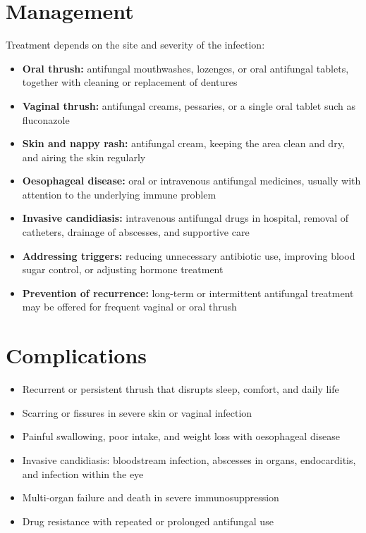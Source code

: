 \section*{Management}
Treatment depends on the site and severity of the infection:
\begin{itemize}
    \item \textbf{Oral thrush:} antifungal mouthwashes, lozenges, or oral antifungal tablets, together with cleaning or replacement of dentures
    \item \textbf{Vaginal thrush:} antifungal creams, pessaries, or a single oral tablet such as fluconazole
    \item \textbf{Skin and nappy rash:} antifungal cream, keeping the area clean and dry, and airing the skin regularly
    \item \textbf{Oesophageal disease:} oral or intravenous antifungal medicines, usually with attention to the underlying immune problem
    \item \textbf{Invasive candidiasis:} intravenous antifungal drugs in hospital, removal of catheters, drainage of abscesses, and supportive care
    \item \textbf{Addressing triggers:} reducing unnecessary antibiotic use, improving blood sugar control, or adjusting hormone treatment
    \item \textbf{Prevention of recurrence:} long-term or intermittent antifungal treatment may be offered for frequent vaginal or oral thrush
\end{itemize}

\section*{Complications}
\begin{itemize}
    \item Recurrent or persistent thrush that disrupts sleep, comfort, and daily life
    \item Scarring or fissures in severe skin or vaginal infection
    \item Painful swallowing, poor intake, and weight loss with oesophageal disease
    \item Invasive candidiasis: bloodstream infection, abscesses in organs, endocarditis, and infection within the eye
    \item Multi-organ failure and death in severe immunosuppression
    \item Drug resistance with repeated or prolonged antifungal use
\end{itemize}

